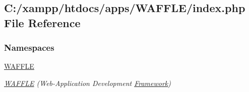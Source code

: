 \hypertarget{index_8php}{}\subsection{C\+:/xampp/htdocs/apps/\+W\+A\+F\+F\+L\+E/index.php File Reference}
\label{index_8php}
\subsubsection*{Namespaces}
\begin{DoxyCompactItemize}
\item 
 \hyperlink{namespace_w_a_f_f_l_e}{W\+A\+F\+F\+LE}
\begin{DoxyCompactList}\small\item\em \hyperlink{namespace_w_a_f_f_l_e}{W\+A\+F\+F\+LE} (Web-\/\+Application Development \hyperlink{namespace_w_a_f_f_l_e_1_1_framework}{Framework}) \end{DoxyCompactList}\end{DoxyCompactItemize}
